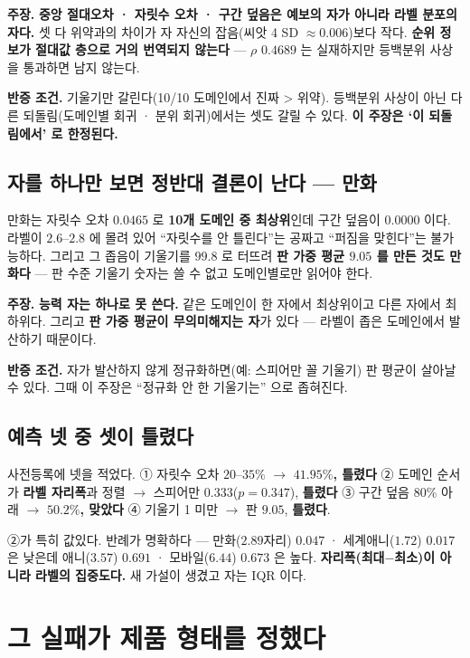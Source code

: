 \documentclass[10pt,a4paper]{article}
\newcommand{\claim}[2]{\begin{claimbox}\textbf{주장.} #1\par\smallskip
  \textcolor{gray!70}{\textbf{반증 조건.} #2}\end{claimbox}}
\begin{document}
\claim{\textbf{중앙 절대오차 · 자릿수 오차 · 구간 덮음은 예보의 자가 아니라 라벨
분포의 자다.} 셋 다 위약과의 차이가 자 자신의 잡음(씨앗 4 SD $\approx 0.006$)보다
작다. \textbf{순위 정보가 절대값 층으로 거의 번역되지 않는다} --- $\rho$ $0.4689$
는 실재하지만 등백분위 사상을 통과하면 남지 않는다.}
{기울기만 갈린다(10/10 도메인에서 진짜 > 위약). 등백분위 사상이 아닌 다른
되돌림(도메인별 회귀 · 분위 회귀)에서는 셋도 갈릴 수 있다. \textbf{이 주장은
`이 되돌림에서' 로 한정된다.}}

\subsection*{자를 하나만 보면 정반대 결론이 난다 --- 만화}

만화는 자릿수 오차 $0.0465$ 로 \textbf{10개 도메인 중 최상위}인데 구간 덮음이
\textbf{$0.0000$} 이다. 라벨이 $2.6$--$2.8$ 에 몰려 있어 ``자릿수를 안 틀린다''는
공짜고 ``퍼짐을 맞힌다''는 불가능하다. 그리고 그 좁음이 기울기를 $99.8$ 로
터뜨려 \textbf{판 가중 평균 $9.05$ 를 만든 것도 만화다} --- 판 수준 기울기 숫자는
쓸 수 없고 도메인별로만 읽어야 한다.

\claim{\textbf{능력 자는 하나로 못 쓴다.} 같은 도메인이 한 자에서 최상위이고 다른
자에서 최하위다. 그리고 \textbf{판 가중 평균이 무의미해지는 자}가 있다 --- 라벨이
좁은 도메인에서 발산하기 때문이다.}
{자가 발산하지 않게 정규화하면(예: 스피어만 꼴 기울기) 판 평균이 살아날 수 있다.
그때 이 주장은 ``정규화 안 한 기울기는'' 으로 좁혀진다.}

\subsection*{예측 넷 중 셋이 틀렸다}

사전등록에 넷을 적었다. ① 자릿수 오차 $20$--$35\%$ $\to$ \textbf{$41.95\%$, 틀렸다}
② 도메인 순서가 \textbf{라벨 자리폭}과 정렬 $\to$ 스피어만 $0.333$($p{=}0.347$),
\textbf{틀렸다} ③ 구간 덮음 80\% 아래 $\to$ \textbf{$50.2\%$, 맞았다}
④ 기울기 1 미만 $\to$ 판 $9.05$, \textbf{틀렸다}.

②가 특히 값있다. 반례가 명확하다 --- 만화($2.89$자리) $0.047$ · 세계애니($1.72$)
$0.017$ 은 낮은데 애니($3.57$) $0.691$ · 모바일($6.44$) $0.673$ 은 높다.
\textbf{자리폭(최대$-$최소)이 아니라 라벨의 집중도다.} 새 가설이 생겼고 자는
IQR 이다.

\section{그 실패가 제품 형태를 정했다}
\end{document}
